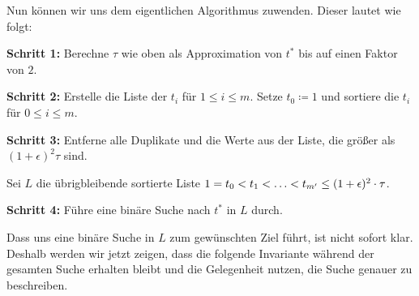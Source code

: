 \documentclass[11pt]{article}
\begin{document}
	Nun können wir uns dem eigentlichen Algorithmus zuwenden. Dieser lautet wie folgt:
	
	\begin{description}
		\item{\textbf{Schritt 1:}} Berechne $\tau$ wie oben als Approximation von $t^*$ bis auf einen Faktor von $2$.
		\item{\textbf{Schritt 2:}} Erstelle die Liste der $t_i$ für $1 \leq i \leq m$. Setze $t_0 \coloneqq 1$ und sortiere die $t_i$ für $0 \leq i \leq m$.
		\item{\textbf{Schritt 3:}} Entferne alle Duplikate und die Werte aus der Liste, die größer als $(1 + \epsilon)^2 \tau$ sind.
		
		Sei $L$ die übrigbleibende sortierte Liste $1 = t_0 < t_1 < \mathellipsis < t_{m'} \leq (1 + \epsilon)^2\cdot \tau$.
		\item{\textbf{Schritt 4:}} Führe eine binäre Suche nach $t^*$ in $L$ durch.
	\end{description}
	
	Dass uns eine binäre Suche in $L$ zum gewünschten Ziel führt, ist nicht sofort klar. Deshalb werden wir jetzt zeigen, dass die folgende Invariante während der gesamten Suche erhalten bleibt und die Gelegenheit nutzen, die Suche genauer zu beschreiben.
	
\end{document}
